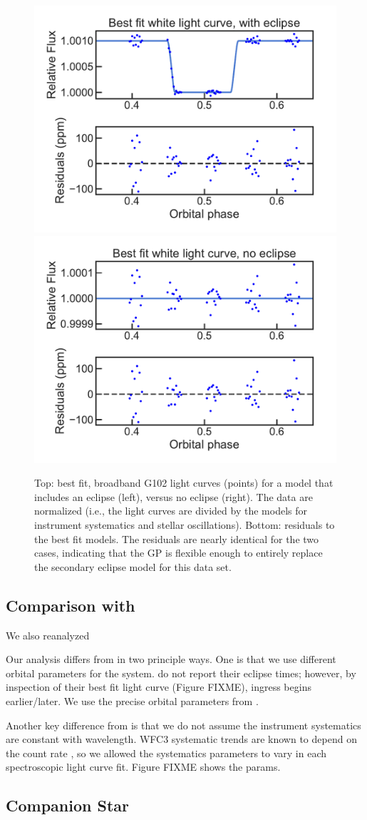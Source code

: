 \documentclass[twocolumn]{aastex62}
\begin{document}
\begin{figure}
\includegraphics[width = 0.5 \textwidth]{figures/eclipse.pdf}
\includegraphics[width = 0.5 \textwidth]{figures/no_eclipse.pdf}
\caption{Top: best fit, broadband G102 light curves (points) for a model that includes an eclipse (left), versus no eclipse (right). The data are normalized (i.e., the light curves are divided by the models for instrument systematics and stellar oscillations). Bottom: residuals to the best fit models. The residuals are nearly identical for the two cases, indicating that the GP is flexible enough to entirely replace the secondary eclipse model for this data set.} 
\label{fig:GP}
\end{figure}

\subsection{Comparison with \cite{haynes15}}
We also reanalyzed 

Our analysis differs from \cite{haynes15} in two principle ways. One is that we use different orbital parameters for the system. \cite{haynes15} do not report their eclipse times; however, by inspection of their best fit light curve (Figure FIXME), ingress begins earlier/later. We use the precise orbital parameters from \cite{zhang17}.

Another key difference from \cite{haynes15} is that we do not assume the instrument systematics are constant with wavelength. WFC3 systematic trends are known to depend on the count rate \cite{zhou17}, so we allowed the systematics parameters to vary in each spectroscopic light curve fit.  Figure FIXME shows the params.


\subsection{Companion Star}




\end{document}
